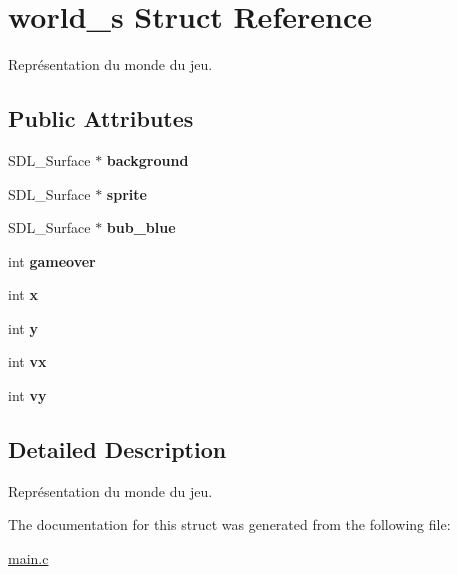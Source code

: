 \hypertarget{structworld__s}{\section{world\-\_\-s Struct Reference}
\label{structworld__s}
}


Représentation du monde du jeu.  


\subsection*{Public Attributes}
\begin{DoxyCompactItemize}
\item 
\hypertarget{structworld__s_a30a6c656a08a302034e42580ad34a6cf}{S\-D\-L\-\_\-\-Surface $\ast$ {\bfseries background}}\label{structworld__s_a30a6c656a08a302034e42580ad34a6cf}

\item 
\hypertarget{structworld__s_af163fff5c7aa6fa67bb0ca63b49ae339}{S\-D\-L\-\_\-\-Surface $\ast$ {\bfseries sprite}}\label{structworld__s_af163fff5c7aa6fa67bb0ca63b49ae339}

\item 
\hypertarget{structworld__s_accf8be2cdeea09e1fac31292cb48f98f}{S\-D\-L\-\_\-\-Surface $\ast$ {\bfseries bub\-\_\-blue}}\label{structworld__s_accf8be2cdeea09e1fac31292cb48f98f}

\item 
\hypertarget{structworld__s_a693aa82d082fe3467969094559b9bc0f}{int {\bfseries gameover}}\label{structworld__s_a693aa82d082fe3467969094559b9bc0f}

\item 
\hypertarget{structworld__s_a2addf2e779d4aa89b24fb173b1267cc6}{int {\bfseries x}}\label{structworld__s_a2addf2e779d4aa89b24fb173b1267cc6}

\item 
\hypertarget{structworld__s_aa18a353365ed643a950250dba17f5b58}{int {\bfseries y}}\label{structworld__s_aa18a353365ed643a950250dba17f5b58}

\item 
\hypertarget{structworld__s_a169ac15721cf738de50843b3f61895c9}{int {\bfseries vx}}\label{structworld__s_a169ac15721cf738de50843b3f61895c9}

\item 
\hypertarget{structworld__s_acaf4d3c8a81d6aa0f77870c81f972cc6}{int {\bfseries vy}}\label{structworld__s_acaf4d3c8a81d6aa0f77870c81f972cc6}

\end{DoxyCompactItemize}


\subsection{Detailed Description}
Représentation du monde du jeu. 

The documentation for this struct was generated from the following file\-:\begin{DoxyCompactItemize}
\item 
\hyperlink{main_8c}{main.\-c}\end{DoxyCompactItemize}

